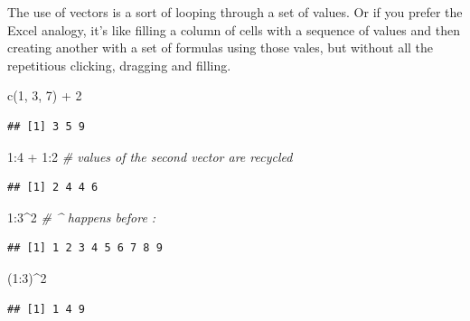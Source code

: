 \documentclass[
]{book}
\newenvironment{Shaded}{\begin{snugshade}}{\end{snugshade}}
\newcommand{\CommentTok}[1]{\textcolor[rgb]{0.56,0.35,0.01}{\textit{#1}}}
\newcommand{\DecValTok}[1]{\textcolor[rgb]{0.00,0.00,0.81}{#1}}
\newcommand{\FunctionTok}[1]{\textcolor[rgb]{0.00,0.00,0.00}{#1}}
\newcommand{\NormalTok}[1]{#1}
\newcommand{\SpecialCharTok}[1]{\textcolor[rgb]{0.00,0.00,0.00}{#1}}
\begin{document}
The use of vectors is a sort of looping through a set of values. Or if you prefer the Excel analogy, it's like filling a column of cells with a sequence of values and then creating another with a set of formulas using those vales, but without all the repetitious clicking, dragging and filling.

\begin{Shaded}
\begin{Highlighting}[]
\FunctionTok{c}\NormalTok{(}\DecValTok{1}\NormalTok{, }\DecValTok{3}\NormalTok{, }\DecValTok{7}\NormalTok{) }\SpecialCharTok{+} \DecValTok{2}
\end{Highlighting}
\end{Shaded}

\begin{verbatim}
## [1] 3 5 9
\end{verbatim}

\begin{Shaded}
\begin{Highlighting}[]
\DecValTok{1}\SpecialCharTok{:}\DecValTok{4} \SpecialCharTok{+} \DecValTok{1}\SpecialCharTok{:}\DecValTok{2} \CommentTok{\# values of the second vector are recycled}
\end{Highlighting}
\end{Shaded}

\begin{verbatim}
## [1] 2 4 4 6
\end{verbatim}

\begin{Shaded}
\begin{Highlighting}[]
\DecValTok{1}\SpecialCharTok{:}\DecValTok{3}\SpecialCharTok{\^{}}\DecValTok{2} \CommentTok{\# \^{} happens before :}
\end{Highlighting}
\end{Shaded}

\begin{verbatim}
## [1] 1 2 3 4 5 6 7 8 9
\end{verbatim}

\begin{Shaded}
\begin{Highlighting}[]
\NormalTok{(}\DecValTok{1}\SpecialCharTok{:}\DecValTok{3}\NormalTok{)}\SpecialCharTok{\^{}}\DecValTok{2}
\end{Highlighting}
\end{Shaded}

\begin{verbatim}
## [1] 1 4 9
\end{verbatim}
\end{document}
